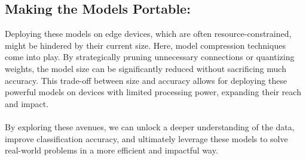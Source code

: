 \documentclass[conference,letterpaper]{IEEEtran}
\begin{document}
\subsection{Making the Models Portable:}
Deploying these models on edge devices, which are often resource-constrained, might be hindered by their current size. Here, model compression techniques come into play. By strategically pruning unnecessary connections or quantizing weights, the model size can be significantly reduced without sacrificing much accuracy. This trade-off between size and accuracy allows for deploying these powerful models on devices with limited processing power, expanding their reach and impact.
\\
\\
By exploring these avenues, we can unlock a deeper understanding of the data, improve classification accuracy, and ultimately leverage these models to solve real-world problems in a more efficient and impactful way.
\vspace{7mm}
%



%
%
\end{document}
